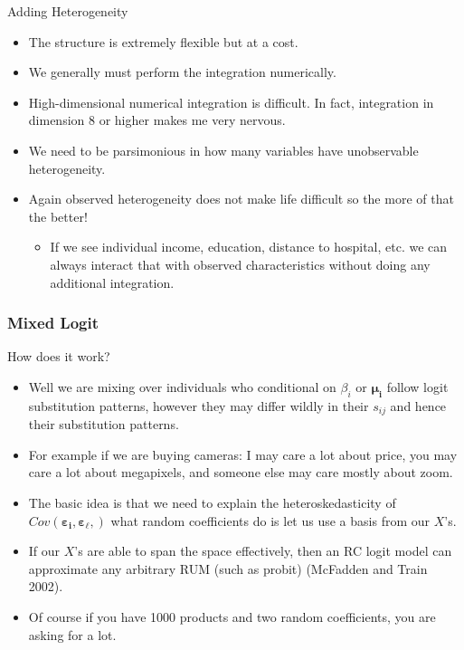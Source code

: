 \documentclass[aspectratio=169,11pt]{beamer}
\begin{document}
\begin{frame}{Adding Heterogeneity}
\begin{itemize}
\item The structure is extremely flexible but at a cost.
\item We generally must perform the integration numerically.
\item High-dimensional numerical integration is difficult. In fact, integration in dimension 8 or higher makes me very nervous.
\item We need to be parsimonious in how many variables have unobservable heterogeneity.
\item Again observed heterogeneity does not make life difficult so the more of that the better!
\begin{itemize}
\item If we see individual income, education, distance to hospital, etc. we can always interact that with observed characteristics without doing any additional integration.
\end{itemize}
\end{itemize}
\end{frame}


\begin{frame}
\frametitle{Mixed Logit}
How does it work?
 \begin{itemize}
\item Well we are mixing over individuals who conditional on $\beta_i$ or $\symbf{\mu_i}$ follow logit substitution patterns, however they may differ wildly in their $s_{ij}$ and hence their substitution patterns.
\item For example if we are buying cameras: I may care a lot about price, you may care a lot about megapixels, and someone else may care mostly about zoom.
\item The basic idea is that we need to explain the heteroskedasticity of $Cov(\symbf{\varepsilon_i}, \symbf{\varepsilon_{\ell}},)$ what random coefficients do is let us use a basis from our $X$'s.
\item If our $X$'s are able to span the space effectively, then an RC logit model can approximate any arbitrary RUM (such as probit) (McFadden and Train 2002). 
\item Of course if you have 1000 products and two random coefficients, you are asking for a lot.
 \end{itemize}
\end{frame}
\end{document}
